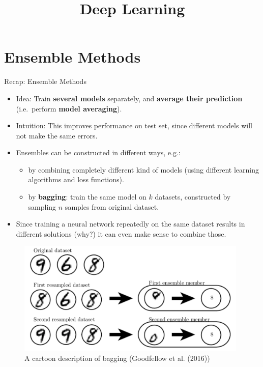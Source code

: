 




\newcommand{\titlefigure}{figure/dropout_goals.png}
\newcommand{\learninggoals}{
  \item Recap: Ensemble Methods
  \item Dropout
  \item Augmentation
}

\title{Deep Learning}
\date{}




\section{Ensemble Methods}
\begin{vbframe}{Recap: Ensemble Methods}

\begin{itemize}
\item Idea: Train \textbf{several models} separately, and \textbf{average their prediction} (i.e.~perform \textbf{model averaging}).
\item Intuition: This improves performance on test set, since different models will not make the same errors.
\item Ensembles can be constructed in different ways, e.g.:
\begin{itemize}
\item by combining completely different kind of models (using different learning algorithms and loss functions).
\item by \textbf{bagging}: train the same model on $k$ datasets, constructed by sampling $n$ samples from original dataset.
\end{itemize}
\item Since training a neural network repeatedly on the same dataset results in different solutions (why?) it can even make sense to combine those.
\end{itemize}

\framebreak 

\begin{figure}
    \centering
      \includegraphics[width=11cm]{figure/bagging.png}
      \caption{ A cartoon description of bagging (Goodfellow et al. (2016))}
  \end{figure}

\end{vbframe}

